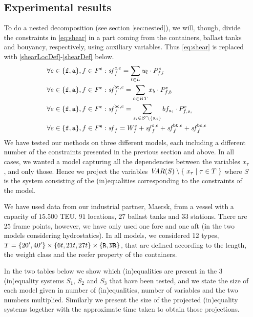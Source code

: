 \subsection{Experimental results}\label{sec:testResults}
To do a nested decomposition (see section \ref{sec:nested}), we will, though, divide the constraints in \eqref{eq:shear} in a part coming from the containers, ballast tanks and bouyancy, respectively, using auxiliary variables. Thus \eqref{eq:shear} is replaced with \eqref{shearLocDef}-\eqref{shearDef} below.
\begin{align}
\label{shearLocDef} 
\forall {e}\in\{\trt{f},\trt{a}\}, f \in \Sec^{e}:&\;
	\shear^{\trt{c},e}_f = \sum_{l \in L} \weight_l\cdot \Prop^{e}_{f,l}\\
%
\forall {e}\in\{\trt{f},\trt{a}\}, f \in \Sec^{e}:&\;
	\label{shearTanksDef}
	\shear^{\trt{bt},e}_f = \sum_{b \in \mi{BT}} x_b\cdot \Prop^{e}_{f,b} \\		
%
\forall {e}\in\{\trt{f},\trt{a}\}, f \in \Sec^{e}:&\;
	\label{shearBonjDef}
	\shear^{\trt{bc},e}_f = \sum_{s_i \in S'\setminus\{s_S\}} \bonjean_{s_i}\cdot \Prop^{e}_{f,s_i} \\
%
\forall {e}\in\{\trt{f},\trt{a}\}, f \in \Sec^\trt{e}:&\;
	\label{shearDef}
 	\shear_f = W^{e}_f +	\shear^{\trt{c},e}_f+ \shear^{\trt{bt},e}_f + \shear^{\trt{bc},e}_f
\end{align}
%
%
We have tested our methods on three different models, each including a different number of the constraints presented in the previous section and above. In all cases, we wanted a model capturing all the dependencies between the  variables $x_\tau$, and only those. Hence we project the variables $\mathit{VAR}(S)\setminus \{\;{x_\tau}\;|\;{\tau\in T}\;\}$ where $S$ is the system consisting of the (in)equalities corresponding to the constraints of the model.

We have used data from our industrial partner, Maersk, from a vessel with a capacity of $15.500$ TEU, $91$ locations, $27$ ballast tanks and $33$ stations. There are $25$ frame points, however, we have only used one fore and one aft (in the two models considering hydrostatics). In all models, we considered 12 types, $T = \{20', 40'\}\times \{6t, 21t, 27t\}\times\{\texttt{R}, \texttt{NR}\}$, that are defined according to the length, the weight class and the reefer property of the containers.

In the two tables below we show which (in)equalities are present in the 3 (in)equality systems $S_1$, $S_2$ and $S_3$ that have been tested, and we state the size of each model given in number of (in)equalities, number of variables and the two numbers multiplied. Similarly we present the size of the projected (in)equality systems together with the approximate time taken to obtain those projections. 

